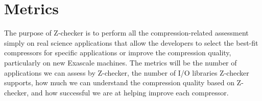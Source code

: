 \section{Metrics}

The purpose of Z-checker is to perform all the compression-related assessment simply on real science applications
that allow the developers to select the best-fit compressors for specific applications or improve the compression quality, particularly on new
Exascale machines. The metrics will be the number of applications we can assess by Z-checker, the number of I/O libraries Z-checker supports, how much we can understand the compression quality based on Z-checker, and how successful we are at helping improve each compressor.
